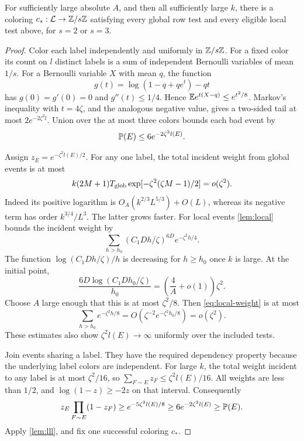 \begin{proposition}\label{prop:outer-tests}
For sufficiently large absolute \(A\), and then all sufficiently large
\(k\), there is a coloring \(c_*:\mathcal L\to\mathbb Z/s\mathbb Z\) satisfying every
global row test and every eligible local test above, for \(s=2\)
or \(s=3\).
\end{proposition}

\begin{proof}
Color each label independently and uniformly in \(\mathbb Z/s\mathbb Z\).
For a fixed color its count on \(l\) distinct labels is a sum of
independent Bernoulli variables of mean \(1/s\).
For a Bernoulli variable \(X\) with mean \(q\), the function
\[
 g(t)=\log(1-q+qe^t)-qt
\]
has \(g(0)=g'(0)=0\) and \(g''(t)\le1/4\).
Hence \(\mathbb E e^{t(X-q)}\le e^{t^2/8}\).
Markov's inequality with \(t=4\zeta\), and the analogous negative
value, gives a two-sided tail at most \(2e^{-2\zeta^2l}\).
Union over the at most three colors bounds each bad event by
\begin{equation}\label{eq:hoeffding}
 \mathbb P(E)\le6e^{-2\zeta^2l(E)}.
\end{equation}

Assign \(z_E=e^{-\zeta^2l(E)/2}\).
For any one label, the total incident weight from global events is
at most
\begin{equation}\label{eq:global-weight}
 k(2M+1)T_{\rm glob}
 \exp[-\zeta^2(\zeta M-1)/2]=o(\zeta^2).
\end{equation}
Indeed its positive logarithm is \(O_A(k^{2/3}L^{5/3})+O(L)\),
whereas its negative term has order \(k^{3/4}/L^3\).
The latter grows faster.
For local events \cref{lem:local} bounds the incident weight by
\begin{equation}\label{eq:local-weight}
 \sum_{h>h_0}
 (C_1Dh/\zeta)^{6D} e^{-\zeta^2h/4}.
\end{equation}
The function \(\log(C_1Dh/\zeta)/h\) is decreasing for \(h\ge h_0\)
once \(k\) is large. At the initial point,
\[
 \frac{6D\log(C_1Dh_0/\zeta)}{h_0}
 =\left(\frac4A+o(1)\right)\zeta^2.
\]
Choose \(A\) large enough that this is at most \(\zeta^2/8\).
Then \eqref{eq:local-weight} is at most
\[
 \sum_{h>h_0} e^{-\zeta^2h/8}
 =O\!\left(\zeta^{-2}e^{-\zeta^2h_0/8}\right)
 =o(\zeta^2).
\]
These estimates also show \(\zeta^2l(E)\to\infty\) uniformly over the
included tests.

Join events sharing a label. They have the required dependency
property because the underlying label colors are independent.
For large \(k\), the total weight incident to any label is at most
\(\zeta^2/16\), so
\(\sum_{F\sim E}z_F\le\zeta^2l(E)/16\).
All weights are less than \(1/2\), and
\(\log(1-z)\ge-2z\) on that interval. Consequently
\[
 z_E\prod_{F\sim E}(1-z_F)
 \ge e^{-5\zeta^2l(E)/8}
 \ge6e^{-2\zeta^2l(E)}
 \ge\mathbb P(E).
\]
Apply \cref{lem:lll}, and fix one successful coloring \(c_*\).
\end{proof}

